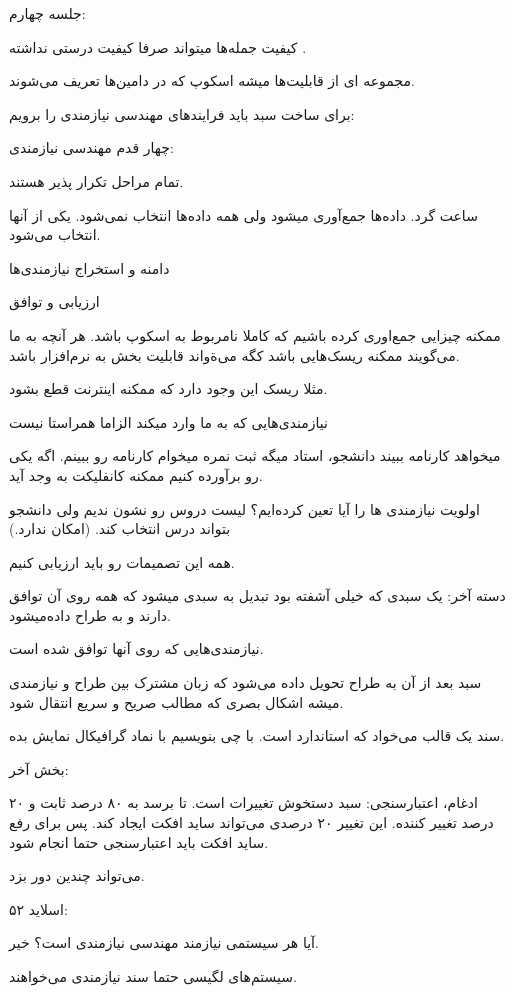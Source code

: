 جلسه چهارم:


کیفیت جمله‌ها میتواند صرفا کیفیت درستی نداشته .

مجموعه ای از قابلیت‌ها میشه اسکوپ که در دامین‌ها تعریف می‌شوند.

برای ساخت سبد باید فرایند‌های مهندسی نیازمندی را برویم:

چهار قدم مهندسی نیازمندی:

تمام مراحل تکرار پذیر هستند.

ساعت گرد. داده‌ها جمع‌آوری میشود ولی همه داده‌ها انتخاب نمی‌شود. یکی از آنها
انتخاب می‌شود.

دامنه و استخراج نیازمندی‌ها

ارزیابی و توافق

ممکنه چیزایی جمع‌اوری کرده باشیم که کاملا نامربوط به اسکوپ باشد. هر آنچه به ما
می‌گویند ممکنه ریسک‌هایی باشد کگه می‌ةواند قابلیت بخش به نرم‌افزار باشد.

مثلا ریسک این وجود دارد که ممکنه اینترنت قطع بشود.

نیازمندی‌هایی که به ما وارد میکند الزاما همراستا نیست

میخواهد کارنامه ببیند دانشجو، استاد میگه ثبت نمره میخوام کارنامه رو ببینم. 
اگه یکی رو برآورده کنیم ممکنه کانفلیکت به وجد آید.

اولویت نیازمندی ها را آیا تعین کرده‌ایم؟ لیست دروس رو نشون ندیم ولی دانشجو
بتواند درس انتخاب کند. (امکان ندارد.)

همه این تصمیمات رو باید ارزیابی کنیم.

دسته آخر: یک سبدی که خیلی آشفته بود تبدیل به سبدی میشود که همه روی آن توافق
دارند و به طراح داده‌میشود.

نیازمندی‌هایی که روی آنها توافق شده است.

سبد بعد از آن به طراح تحویل داده می‌شود که زبان مشترک بین طراح و نیازمندی میشه
اشکال بصری که مطالب صریح و سریع انتقال شود.

سند یک قالب می‌خواد که استاندارد است. با چی بنویسیم با نماد گرافیکال نمایش بده.

بخش آخر:

ادغام، اعتبارسنجی:
سبد دستخوش تغییرات است. تا برسد به ۸۰ درصد ثابت و ۲۰ درصد تغییر کننده. این تغییر
۲۰ درصدی می‌تواند ساید افکت ایجاد کند. پس برای رفع ساید افکت باید اعتبارسنجی
حتما انجام شود.

می‌تواند چندین دور بزد.

اسلاید ۵۲:

آیا هر سیستمی نیازمند مهندسی نیازمندی است؟ خیر. 

سیستم‌های لگیسی حتما سند نیازمندی می‌خواهند. 

